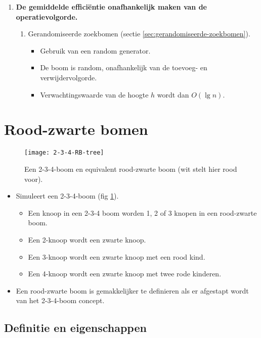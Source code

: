 \begin{itemize}
\begin{enumerate}
        \item \textbf{De gemiddelde efficiëntie onafhankelijk maken van de operatievolgorde.}
        \begin{enumerate}
            \item Gerandomiseerde zoekbomen (sectie \ref{sec:gerandomiseerde-zoekbomen}).
            \begin{itemize}
                \item Gebruik van een random generator.
                \item De boom is random, onafhankelijk van de toevoeg- en verwijdervolgorde.
                \item Verwachtingswaarde van de hoogte $h$ wordt dan $O(\lg n)$.
            \end{itemize}
        \end{enumerate}
    \end{enumerate}
\end{itemize}

\section{Rood-zwarte bomen}
\begin{figure}[ht]
    \centering
    \texttt{[image: 2-3-4-RB-tree]}
    \caption{Een 2-3-4-boom en equivalent rood-zwarte boom (wit stelt hier rood voor).}
    \label{fig:red-black-tree}
\end{figure}
\begin{itemize}
    \item Simuleert een 2-3-4-boom (fig \ref{fig:red-black-tree}).
    \begin{itemize}
        \item Een knoop in een 2-3-4 boom worden 1, 2 of 3 knopen in een rood-zwarte boom.
        \item Een 2-knoop wordt een zwarte knoop.
        \item Een 3-knoop wordt een zwarte knoop met een rood kind.
        \item Een 4-knoop wordt een zwarte knoop met twee rode kinderen.
    \end{itemize}
    \item Een rood-zwarte boom is gemakkelijker te definieren als er afgestapt wordt van het 2-3-4-boom concept.
\end{itemize}
\subsection{Definitie en eigenschappen}


